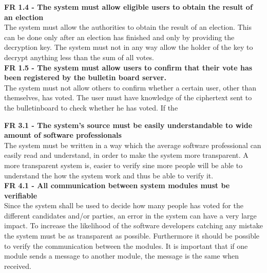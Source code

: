\textbf{FR 1.4 - The system must allow eligible users to obtain the result of an election} \\
The system must allow the authorities to obtain the result of an election. This can be done only after an election has finished and only by providing the decryption key. The system must not in any way allow the holder of the key to decrypt anything less than the sum of all votes. \\
\textbf{FR 1.5 - The system must allow users to confirm that their vote has been registered by the bulletin board server.} \\
The system must not allow others to confirm whether a certain user, other than themselves, has voted. The user must have knowledge of the ciphertext sent to the bulletinboard to check whether he has voted. If the 

\textbf{FR 3.1 - The system's source must be easily understandable to wide amount of software professionals} \\
The system must be written in a way which the average software professional can easily read and understand, in order to make the system more transparent. A more transparent system is, easier to verify sine more people will be able to understand the how the system work and thus be able to verify it. \\


\textbf{FR 4.1 - All communication between system modules must be verifiable} \\
Since the system shall be used to decide how many people has voted for the different candidates and/or parties, an error in the system can have a very large impact. To increase the likelihood of the software developers catching any mistake the system must be as transparent as possible. Furthermore it should be possible to verify the communication between the modules. It is important that if one module sends a message to another module, the message is the same when received.